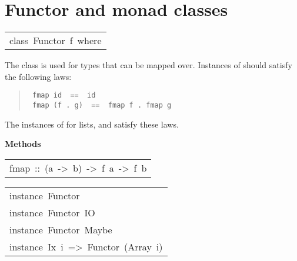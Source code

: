 \section{Functor and monad classes
}
\begin{haddockdesc}
\item[\begin{tabular}{@{}l}
class\ Functor\ f\ where
\end{tabular}]\haddockbegindoc
The  class is used for types that can be mapped over.
Instances of  should satisfy the following laws:
\par
\begin{quote}
{\haddockverb\begin{verbatim}
 fmap id  ==  id
 fmap (f . g)  ==  fmap f . fmap g
\end{verbatim}}
\end{quote}
The instances of  for lists,  and 
satisfy these laws.
\par

\haddockpremethods{}\textbf{Methods}
\begin{haddockdesc}
\item[\begin{tabular}{@{}l}
fmap\ ::\ (a\ ->\ b)\ ->\ f\ a\ ->\ f\ b
\end{tabular}]
\end{haddockdesc}
\end{haddockdesc}
\begin{haddockdesc}
\item[\begin{tabular}{@{}l}
instance\ Functor\ {\char 91}{\char 93}\\instance\ Functor\ IO\\instance\ Functor\ Maybe\\instance\ Ix\ i\ =>\ Functor\ (Array\ i)
\end{tabular}]
\end{haddockdesc}
